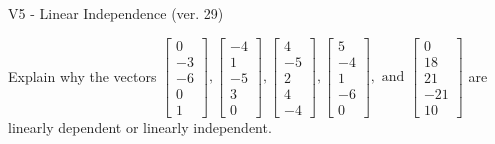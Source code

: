 \begin{exercise}
  \begin{exerciseTitle}V5 - Linear Independence (ver. 29)\end{exerciseTitle}
  \begin{exerciseStatement}
    Explain why the vectors \(\left[\begin{array}{r}
0 \\
-3 \\
-6 \\
0 \\
1
\end{array}\right] , \left[\begin{array}{r}
-4 \\
1 \\
-5 \\
3 \\
0
\end{array}\right] , \left[\begin{array}{r}
4 \\
-5 \\
2 \\
4 \\
-4
\end{array}\right] , \left[\begin{array}{r}
5 \\
-4 \\
1 \\
-6 \\
0
\end{array}\right] , \text{ and } \left[\begin{array}{r}
0 \\
18 \\
21 \\
-21 \\
10
\end{array}\right]\) are linearly dependent or linearly independent.	



\end{exerciseStatement}
\end{exercise}
